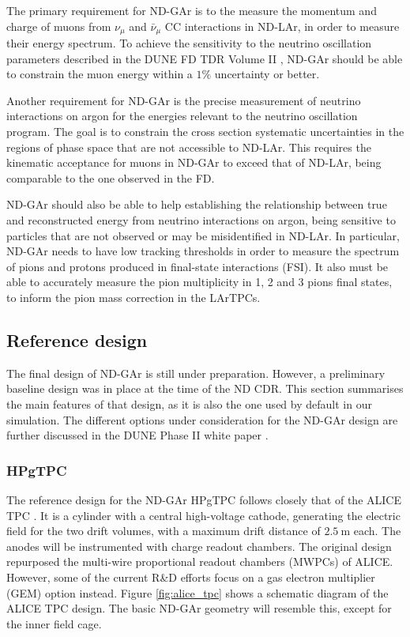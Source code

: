 The primary requirement for ND-GAr is to the measure the momentum and charge of muons from $\nu_{\mu}$ and $\bar{\nu}_{\mu}$ CC interactions in ND-LAr, in order to measure their energy spectrum. To achieve the sensitivity to the neutrino oscillation parameters described in the DUNE FD TDR Volume II \cite{DUNE2020TDR2}, ND-GAr should be able to constrain the muon energy within a $1\%$ uncertainty or better.

Another requirement for ND-GAr is the precise measurement of neutrino interactions on argon for the energies relevant to the neutrino oscillation program. The goal is to constrain the cross section systematic uncertainties in the regions of phase space that are not accessible to ND-LAr. This requires the kinematic acceptance for muons in ND-GAr to exceed that of ND-LAr, being comparable to the one observed in the FD.

ND-GAr should also be able to help establishing the relationship between true and reconstructed energy from neutrino interactions on argon, being sensitive to particles that are not observed or may be misidentified in ND-LAr. In particular, ND-GAr needs to have low tracking thresholds in order to measure the spectrum of pions and protons produced in final-state interactions (FSI). It also must be able to accurately measure the pion multiplicity in 1, 2 and 3 pions final states, to inform the pion mass correction in the LArTPCs.

\subsection{Reference design}

The final design of ND-GAr is still under preparation. However, a preliminary baseline design was in place at the time of the ND CDR. This section summarises the main features of that design, as it is also the one used by default in our simulation. The different options under consideration for the ND-GAr design are further discussed in the DUNE Phase II white paper \cite{DUNE2024Phase2}.

\subsubsection{HPgTPC}

The reference design for the ND-GAr HPgTPC follows closely that of the ALICE TPC \cite{ALICE2006}. It is a cylinder with a central high-voltage cathode, generating the electric field for the two drift volumes, with a maximum drift distance of $2.5~\mathrm{m}$ each. The anodes will be instrumented with charge readout chambers. The original design repurposed the multi-wire proportional readout chambers (MWPCs) of ALICE. However, some of the current R\&D efforts focus on a gas electron multiplier (GEM) \cite{Sauli1997} option instead. Figure \ref{fig:alice_tpc} shows a schematic diagram of the ALICE TPC design. The basic ND-GAr geometry will resemble this, except for the inner field cage.

